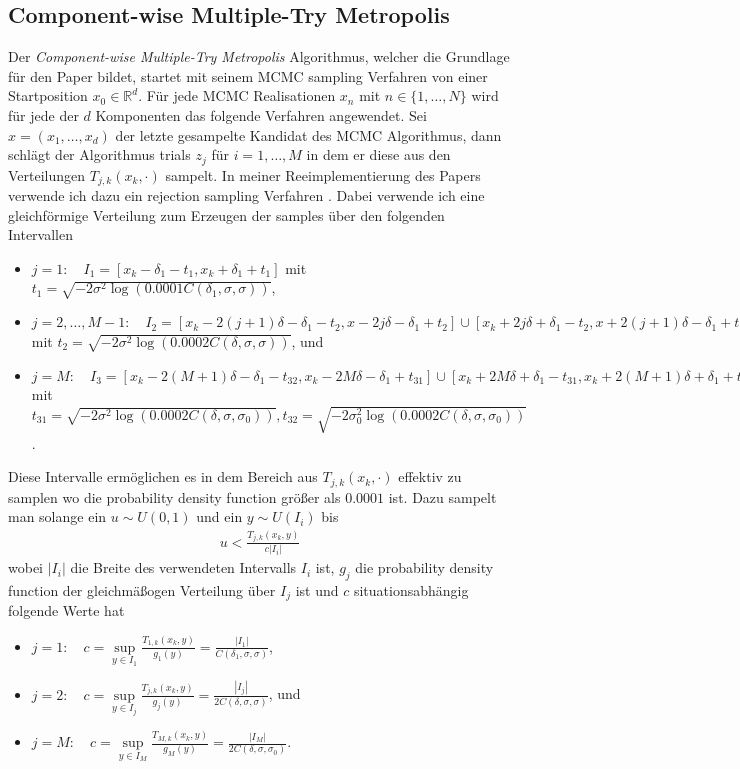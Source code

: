 \documentclass{scrartcl}
\DeclareMathOperator{\sup}{sup}
\begin{document}
    \subsection{Component-wise Multiple-Try Metropolis} Der \textit{Component-wise Multiple-Try Metropolis} Algorithmus,
    welcher die Grundlage für den Paper \cite{lau2019} bildet, startet mit seinem MCMC sampling Verfahren von einer Startposition
	$x_0\in\mathbb{R}^d$. Für jede MCMC Realisationen $x_n$ mit $n\in\{1,\dots,N\}$ wird für jede der $d$ Komponenten das folgende Verfahren
	angewendet. Sei $x=(x_1,\dots,x_d)$ der letzte gesampelte Kandidat des MCMC Algorithmus, dann schlägt der Algorithmus trials $z_j$
    für $i=1,\dots,M$ in dem er diese aus den Verteilungen $T_{j,k}(x_k,\cdot)$ sampelt. In meiner Reeimplementierung des Papers verwende
    ich dazu ein rejection sampling Verfahren \cite{rejection_sampling}. Dabei verwende ich eine gleichförmige Verteilung zum Erzeugen der samples über den folgenden Intervallen
    \begin{itemize}
        \item $j=1:\quad I_1=[x_k-\delta_1-t_1,x_k+\delta_1+t_1]$ mit $t_1 = \sqrt{-2\sigma^2\log(0.0001C(\delta_1,\sigma,\sigma))}$,
        \item $j=2,\dots,M-1:\quad I_2=[x_k-2(j+1)\delta-\delta_1-t_2,x-2j\delta-\delta_1+t_2]\cup[x_k+2j\delta+\delta_1-t_2,x+2(j+1)\delta-\delta_1+t_2]$ mit $t_2=\sqrt{-2\sigma^2\log(0.0002C(\delta,\sigma,\sigma))}$, und
        \item $j=M:\quad I_3=[x_k-2(M+1)\delta-\delta_1-t_{32},x_k-2M\delta-\delta_1+t_{31}]\cup[x_k+2M\delta+\delta_1-t_{31},x_k+2(M+1)\delta+\delta_1+t_{32}]$ mit $t_{31}=\sqrt{-2\sigma^2\log(0.0002C(\delta,\sigma,\sigma_0))},t_{32}=\sqrt{-2\sigma_0^2\log(0.0002C(\delta,\sigma,\sigma_0))}$.
    \end{itemize}
    Diese Intervalle ermöglichen es in dem Bereich aus $T_{j,k}(x_k,\cdot)$ effektiv zu samplen wo die probability density function größer als $0.0001$ ist.
    Dazu sampelt man solange ein $u\sim U(0,1)$ und ein $y\sim U(I_i)$ bis
    \begin{align*}
        u < \frac{T_{j,k}(x_k,y)}{c|I_i|}
    \end{align*}
    wobei $|I_i|$ die Breite des verwendeten Intervalls $I_i$ ist, $g_j$ die probability density function der gleichmäßogen Verteilung über $I_j$ ist und $c$ situationsabhängig folgende Werte hat
    \begin{itemize}
        \item $j=1:\quad c=\sup\limits_{y\in I_1}\frac{T_{1,k}(x_k,y)}{g_1(y)}=\frac{|I_1|}{C(\delta_1,\sigma,\sigma)}$,
        \item $j=2:\quad c=\sup\limits_{y\in I_j}\frac{T_{j,k}(x_k,y)}{g_j(y)}=\frac{|I_j|}{2C(\delta,\sigma,\sigma)}$, und
        \item $j=M:\quad c=\sup\limits_{y\in I_M}\frac{T_{M,k}(x_k,y)}{g_M(y)}=\frac{|I_M|}{2C(\delta,\sigma,\sigma_0)}$.
    \end{itemize}
\end{document}

